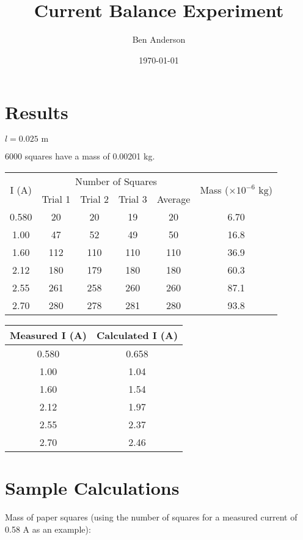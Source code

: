 \documentclass[a4paper,11pt]{article}
\begin{document}
\title{Current Balance Experiment}
\author{Ben Anderson}
\date{\today}
\maketitle


\section{Results}

$l = 0.025\mbox{ m}$

6000 squares have a mass of 0.00201 kg.

\begin{center}
\begin{tabular}{c|c|c|c|c|c}
\multirow{2}{*}{I (A)} & \multicolumn{4}{c|}{Number of Squares} & \multirow{2}{*}{Mass ($\times 10^{-6}\mbox{ kg}$)} \\
\cline{2-5}
& Trial 1 & Trial 2 & Trial 3 & Average & \\
\hline
0.580 & 20  & 20  & 19  & 20  & 6.70 \\
1.00  & 47  & 52  & 49  & 50  & 16.8 \\
1.60  & 112 & 110 & 110 & 110 & 36.9 \\
2.12  & 180 & 179 & 180 & 180 & 60.3 \\
2.55  & 261 & 258 & 260 & 260 & 87.1 \\
2.70  & 280 & 278 & 281 & 280 & 93.8 \\
\end{tabular}
\end{center}

\begin{center}
\begin{tabular}{c|c}
Measured I (A) & Calculated I (A) \\
\hline
0.580 & 0.658 \\
1.00  & 1.04  \\
1.60  & 1.54  \\
2.12  & 1.97  \\
2.55  & 2.37  \\
2.70  & 2.46  \\
\end{tabular}
\end{center}


\section{Sample Calculations}

Mass of paper squares (using the number of squares for a measured current of
0.58 A as an example):
\end{document}
